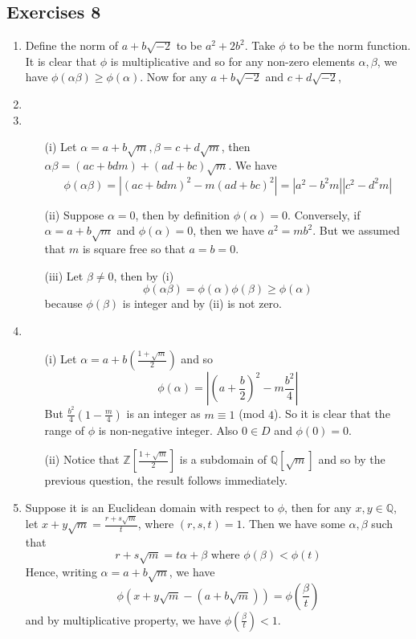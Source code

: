 \subsection{Exercises 8}
\begin{enumerate}
\item Define the norm of $a+b\sqrt{-2}$ to be $a^2+2b^2$. Take $\phi$ to be the norm function. It is clear that $\phi$ is multiplicative and so for any non-zero elements $\alpha,\beta$, we have
    $\phi(\alpha \beta) \ge \phi(\alpha)$. Now for any $a+b\sqrt{-2}$ and $c+d\sqrt{-2}$,
\item
\item \begin{enumerate}
      \item[(i)] Let $\alpha=a+b\sqrt{m},\beta=c+d\sqrt{m}$, then $\alpha \beta=(ac+bdm)+(ad+bc)\sqrt{m}$. We have
      $$\phi(\alpha \beta)=|(ac+bdm)^2-m(ad+bc)^2|=|a^2-b^2m||c^2-d^2m|$$
      \item[(ii)] Suppose $\alpha=0$, then by definition $\phi(\alpha)=0$. Conversely, if $\alpha=a+b\sqrt{m}$ and $\phi(\alpha)=0$, then we have $a^2=mb^2$. But we assumed that
          $m$ is square free so that $a=b=0$.\\
      \item[(iii)] Let $\beta \neq 0$, then by (i)
      $$\phi(\alpha \beta) =\phi(\alpha) \phi(\beta) \ge \phi(\alpha)$$ because
      $\phi(\beta)$ is integer and by (ii) is not zero.
      \end{enumerate}
\item \begin{enumerate}
      \item[(i)] Let $\alpha=a+b(\frac{1+\sqrt{m}}{2})$ and so
      $$\phi(\alpha)=\left|\left(a+\frac{b}{2}\right)^2 -m\frac{b^2}{4}\right|$$
      But $\frac{b^2}{4}(1-\frac{m}{4})$ is an integer as $m \equiv 1$ (mod $4$). So it is clear that
      the range of $\phi$ is non-negative integer. Also $0 \in D$ and $\phi(0)=0$.\\
      \item[(ii)] Notice that $\mathbb{Z}[\frac{1+\sqrt{m}}{2}]$ is a subdomain of $\mathbb{Q}[\sqrt{m}]$ and so by the previous question, the result follows immediately.
      \end{enumerate}
\item Suppose it is an Euclidean domain with respect to $\phi$, then for any $x,y \in \mathbb{Q}$, let
      $x+y\sqrt{m}=\frac{r+s\sqrt{m}}{t}$, where $(r,s,t)=1$. Then we have some $\alpha,\beta$ such that
      $$r+s\sqrt{m}=t\alpha+\beta \text{ where } \phi(\beta) < \phi(t)$$
      Hence, writing $\alpha=a+b\sqrt{m}$, we have
      $$\phi(x+y\sqrt{m}-(a+b\sqrt{m}))=\phi\left(\frac{\beta}{t}\right)$$
      and by multiplicative property, we have $\phi(\frac{\beta}{t})<1$.


\end{enumerate}
